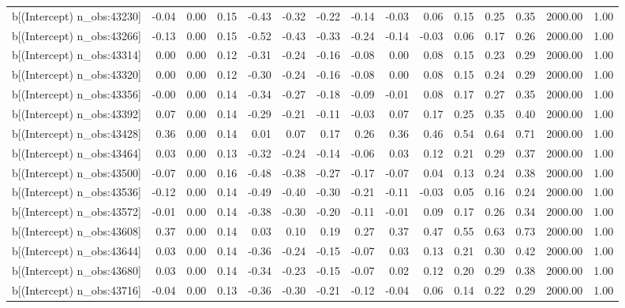 \begin{table}[ht]
\begin{tabular}{rrrrrrrrrrrrrrr}
  b[(Intercept) n\_obs:43230] & -0.04 & 0.00 & 0.15 & -0.43 & -0.32 & -0.22 & -0.14 & -0.03 & 0.06 & 0.15 & 0.25 & 0.35 & 2000.00 & 1.00 \\ 
  b[(Intercept) n\_obs:43266] & -0.13 & 0.00 & 0.15 & -0.52 & -0.43 & -0.33 & -0.24 & -0.14 & -0.03 & 0.06 & 0.17 & 0.26 & 2000.00 & 1.00 \\ 
  b[(Intercept) n\_obs:43314] & 0.00 & 0.00 & 0.12 & -0.31 & -0.24 & -0.16 & -0.08 & 0.00 & 0.08 & 0.15 & 0.23 & 0.29 & 2000.00 & 1.00 \\ 
  b[(Intercept) n\_obs:43320] & 0.00 & 0.00 & 0.12 & -0.30 & -0.24 & -0.16 & -0.08 & 0.00 & 0.08 & 0.15 & 0.24 & 0.29 & 2000.00 & 1.00 \\ 
  b[(Intercept) n\_obs:43356] & -0.00 & 0.00 & 0.14 & -0.34 & -0.27 & -0.18 & -0.09 & -0.01 & 0.08 & 0.17 & 0.27 & 0.35 & 2000.00 & 1.00 \\ 
  b[(Intercept) n\_obs:43392] & 0.07 & 0.00 & 0.14 & -0.29 & -0.21 & -0.11 & -0.03 & 0.07 & 0.17 & 0.25 & 0.35 & 0.40 & 2000.00 & 1.00 \\ 
  b[(Intercept) n\_obs:43428] & 0.36 & 0.00 & 0.14 & 0.01 & 0.07 & 0.17 & 0.26 & 0.36 & 0.46 & 0.54 & 0.64 & 0.71 & 2000.00 & 1.00 \\ 
  b[(Intercept) n\_obs:43464] & 0.03 & 0.00 & 0.13 & -0.32 & -0.24 & -0.14 & -0.06 & 0.03 & 0.12 & 0.21 & 0.29 & 0.37 & 2000.00 & 1.00 \\ 
  b[(Intercept) n\_obs:43500] & -0.07 & 0.00 & 0.16 & -0.48 & -0.38 & -0.27 & -0.17 & -0.07 & 0.04 & 0.13 & 0.24 & 0.38 & 2000.00 & 1.00 \\ 
  b[(Intercept) n\_obs:43536] & -0.12 & 0.00 & 0.14 & -0.49 & -0.40 & -0.30 & -0.21 & -0.11 & -0.03 & 0.05 & 0.16 & 0.24 & 2000.00 & 1.00 \\ 
  b[(Intercept) n\_obs:43572] & -0.01 & 0.00 & 0.14 & -0.38 & -0.30 & -0.20 & -0.11 & -0.01 & 0.09 & 0.17 & 0.26 & 0.34 & 2000.00 & 1.00 \\ 
  b[(Intercept) n\_obs:43608] & 0.37 & 0.00 & 0.14 & 0.03 & 0.10 & 0.19 & 0.27 & 0.37 & 0.47 & 0.55 & 0.63 & 0.73 & 2000.00 & 1.00 \\ 
  b[(Intercept) n\_obs:43644] & 0.03 & 0.00 & 0.14 & -0.36 & -0.24 & -0.15 & -0.07 & 0.03 & 0.13 & 0.21 & 0.30 & 0.42 & 2000.00 & 1.00 \\ 
  b[(Intercept) n\_obs:43680] & 0.03 & 0.00 & 0.14 & -0.34 & -0.23 & -0.15 & -0.07 & 0.02 & 0.12 & 0.20 & 0.29 & 0.38 & 2000.00 & 1.00 \\ 
  b[(Intercept) n\_obs:43716] & -0.04 & 0.00 & 0.13 & -0.36 & -0.30 & -0.21 & -0.12 & -0.04 & 0.06 & 0.14 & 0.22 & 0.29 & 2000.00 & 1.00 \\ 

\end{tabular}
\end{table}
